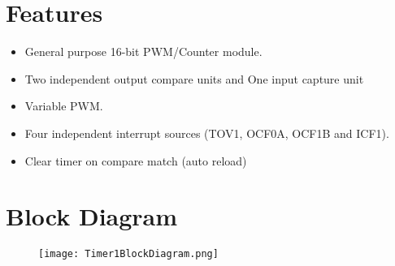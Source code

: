 




% 

\section{Features}
\begin{itemize}
    \item General purpose 16-bit PWM/Counter module.
    \item Two independent output compare units and One input capture unit
    \item Variable PWM.
    \item Four independent interrupt sources (TOV1, OCF0A, OCF1B and ICF1).
    \item Clear timer on compare match (auto reload)
\end{itemize}

\section{Block Diagram}
\begin{figure}[H]
    \begin{center}
        \texttt{[image: Timer1BlockDiagram.png]}
    \end{center}
\end{figure}

